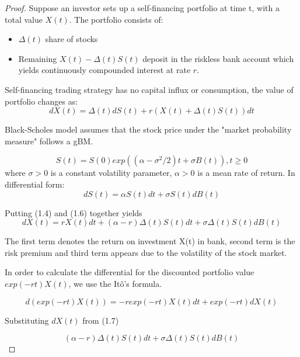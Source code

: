 \documentclass[12pt, oneside]{book}
\theoremstyle{plain}
\theoremstyle{definition}
\begin{document}
\begin{proof} 

Suppose an investor sets up a self-financing portfolio at time t, with a total value $ X(t)$. 
The portfolio consists of:
\begin{itemize}
\item $ \Delta(t) $ share of stocks
\item Remaining $ X(t) - \Delta(t)S(t) $ deposit in the riskless bank account which yields continuously compounded interest at rate $r$.
 
\end{itemize}
Self-financing trading strategy has no capital influx or consumption, the value of portfolio changes as: 
\begin{equation}
dX(t) =  \Delta(t)dS(t) + r(X(t) +  \Delta(t)S(t))dt
\end{equation}

Black-Scholes model assumes that the stock price under the "market probability measure" follows a gBM. 

\begin{equation}
S(t) = S(0) exp((\alpha - \sigma^2/2)t + \sigma B(t)), t \geq 0
\end{equation} where $\sigma > 0$ is a constant volatility parameter, $ \alpha > 0$ is a mean rate of return. In differential form: 
\begin{equation}
dS(t) = \alpha S(t)dt + \sigma S(t)dB(t) 
\end{equation}

Putting (1.4) and (1.6) together yields
\begin{equation}
 dX(t) = rX(t)dt + (\alpha - r) \Delta(t)S(t)dt + \sigma \Delta(t)S(t)dB(t)
\end{equation}

The first term denotes the return on investment X(t) in bank, second term is the risk premium and third term appears due to the volatility of the stock market.

In order to calculate the differential for the discounted portfolio value $exp(-rt) X(t) $, we use the It\^{o}'s formula.

\begin{equation}
 d(exp(-rt) X(t)) = -r exp(-rt) X(t)dt + exp(-rt) dX(t)
 \end{equation}
 
 Substituting $dX(t)$ from (1.7)
 
 \begin{equation}
 (\alpha - r) \Delta(t)S(t)dt + \sigma \Delta(t)S(t)dB(t)
\end{equation}

\end{proof}
\end{document}
